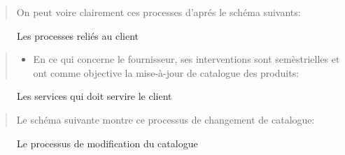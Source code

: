 \documentclass[a4paper]{report}
\begin{document}
\begin{doublespace}
\begin{quote}
On peut voire clairement ces processes d'aprés le schéma suivants:
\end{quote}


\begin{figure}[H] 
	\begin{center}
		\caption{Les processes reliés au client}
	\end{center}
\end{figure}

\begin{quote}
\begin{itemize}
\item
  En ce qui concerne le fournisseur, ses interventions sont
  semèstrielles et ont comme objective la mise-à-jour de catalogue des
  produits:
\end{itemize}
\end{quote}

\begin{figure}[H] 
	\begin{center}
		\caption{Les services qui doit servire le client}
	\end{center}
\end{figure}

\begin{quote}
Le schéma suivante montre ce processus de changement de catalogue:
\end{quote}

\begin{figure}[H] 
	\begin{center}
		\caption{Le processus de modification du catalogue}
	\end{center}
\end{figure}


\end{doublespace}
\end{document}

